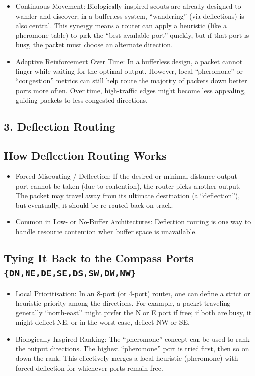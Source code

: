 \documentclass[../HFT-main.tex]{subfiles} %
\begin{document}
\begin{itemize}
\item Continuous Movement: Biologically inspired scouts are already designed to wander and discover; in a bufferless system, “wandering” (via deflections) is also central. This synergy means a router can apply a heuristic (like a pheromone table) to pick the “best available port” quickly, but if that port is busy, the packet must choose an alternate direction.
\item Adaptive Reinforcement Over Time: In a bufferless design, a packet cannot linger while waiting for the optimal output. However, local “pheromone” or “congestion” metrics can still help route the majority of packets down better ports more often. Over time, high-traffic edges might become less appealing, guiding packets to less-congested directions.
\end{itemize}

\subsection{3. Deflection Routing}

\subsection{How Deflection Routing Works}

\begin{itemize}
\item Forced Misrouting / Deflection: If the desired or minimal-distance output port cannot be taken (due to contention), the router picks another output. The packet may travel away from its ultimate destination (a “deflection”), but eventually, it should be re-routed back on track.
\item Common in Low- or No-Buffer Architectures: Deflection routing is one way to handle resource contention when buffer space is unavailable.
\end{itemize}

\subsection{Tying It Back to the Compass Ports \texttt{\{DN,NE,DE,SE,DS,SW,DW,NW\}}}

\begin{itemize}
\item Local Prioritization: In an 8-port (or 4-port) router, one can define a strict or heuristic priority among the directions. For example, a packet traveling generally “north-east” might prefer the N or E port if free; if both are busy, it might deflect NE, or in the worst case, deflect NW or SE.
\item Biologically Inspired Ranking: The “pheromone” concept can be used to rank the output directions. The highest “pheromone” port is tried first, then so on down the rank. This effectively merges a local heuristic (pheromone) with forced deflection for whichever ports remain free.
\end{itemize}
\end{document}
